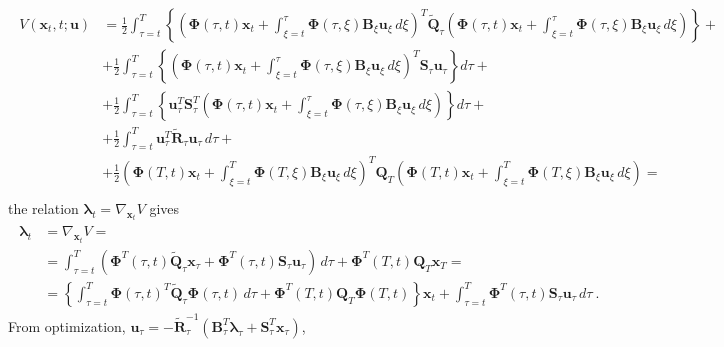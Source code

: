 \documentclass[letterpaper,10pt,english]{jupyterBook}
\begin{document}
\begin{equation*}
\begin{split}\begin{aligned}
  V(\mathbf{x}_t,t; \mathbf{u}) 
  & = \frac{1}{2} \int_{\tau=t}^{T} \left\{ \left( \boldsymbol\Phi(\tau,t) \mathbf{x}_t + \int_{\xi=t}^{\tau} \boldsymbol\Phi(\tau,\xi) \mathbf{B}_\xi \mathbf{u}_\xi \, d \xi \right)^T \widetilde{\mathbf{Q}}_\tau \left( \boldsymbol\Phi(\tau,t) \mathbf{x}_t + \int_{\xi=t}^{\tau} \boldsymbol\Phi(\tau,\xi) \mathbf{B}_\xi \mathbf{u}_\xi \, d \xi \right) \right\} + \\
  & + \frac{1}{2} \int_{\tau=t}^{T} \left\{ \left( \boldsymbol\Phi(\tau,t) \mathbf{x}_t + \int_{\xi=t}^{\tau} \boldsymbol\Phi(\tau,\xi) \mathbf{B}_\xi \mathbf{u}_\xi \, d \xi \right)^T \mathbf{S}_\tau \mathbf{u}_\tau \right\} d \tau + \\
  & + \frac{1}{2} \int_{\tau=t}^{T} \left\{  \mathbf{u}_\tau^T \mathbf{S}_\tau^T \left( \boldsymbol\Phi(\tau,t) \mathbf{x}_t + \int_{\xi=t}^{\tau} \boldsymbol\Phi(\tau,\xi) \mathbf{B}_\xi \mathbf{u}_\xi \, d \xi \right)\right\} d \tau + \\
  & + \frac{1}{2} \int_{\tau=t}^{T} \mathbf{u}_\tau^T \widetilde{\mathbf{R}}_\tau \mathbf{u}_\tau \,  d \tau + \\
  & + \frac{1}{2} \left( \boldsymbol\Phi(T,t) \mathbf{x}_t + \int_{\xi=t}^{T} \boldsymbol\Phi(T,\xi) \mathbf{B}_\xi \mathbf{u}_\xi \, d \xi  \right)^T \mathbf{Q}_T \left( \boldsymbol\Phi(T,t) \mathbf{x}_t + \int_{\xi=t}^{T} \boldsymbol\Phi(T,\xi) \mathbf{B}_\xi \mathbf{u}_\xi \, d \xi  \right) = \\
\end{aligned}\end{split}
\end{equation*}
\sphinxAtStartPar
the relation \(\boldsymbol\lambda_t = \nabla_{\mathbf{x}_t} V\) gives
\begin{equation*}
\begin{split}\begin{aligned}
  \boldsymbol\lambda_t 
  & = \nabla_{\mathbf{x}_t} V = \\
  & = \int_{\tau=t}^T \left( \boldsymbol\Phi^T(\tau,t) \widetilde{\mathbf{Q}}_\tau \mathbf{x}_\tau + \boldsymbol\Phi^T(\tau,t) \mathbf{S}_\tau \mathbf{u}_\tau \right) \, d \tau + \boldsymbol\Phi^T(T,t) \mathbf{Q}_T \mathbf{x}_T = \\ 
  & = \left\{ \int_{\tau=t}^T \boldsymbol\Phi(\tau,t)^T \widetilde{\mathbf{Q}}_\tau \boldsymbol\Phi(\tau,t) \, d \tau + \boldsymbol\Phi^T(T,t) \mathbf{Q}_T \boldsymbol\Phi(T,t) \right\} \mathbf{x}_t + \int_{\tau=t}^T \boldsymbol\Phi^T(\tau,t) \mathbf{S}_\tau \mathbf{u}_\tau \, d \tau \ .
\end{aligned}\end{split}
\end{equation*}
\sphinxAtStartPar
From optimization, \(\mathbf{u}_\tau = - \widetilde{\mathbf{R}}^{-1}_\tau \left( \mathbf{B}_\tau^T \boldsymbol\lambda_\tau + \mathbf{S}^T_\tau \mathbf{x}_\tau \right)\),
\end{document}
